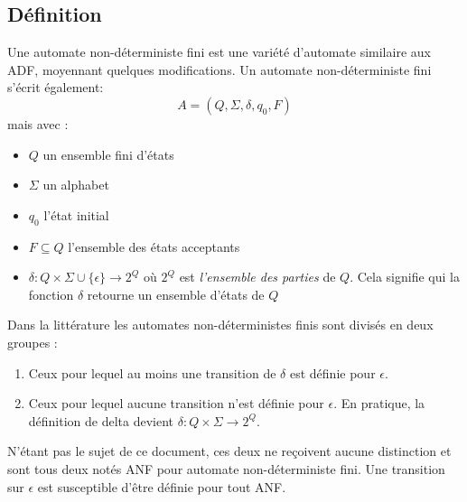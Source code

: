 \subsection{Définition}

Une automate non-déterministe fini est une variété d'automate similaire aux ADF, moyennant quelques modifications. Un automate non-déterministe fini s'écrit également:
	$$
	A=(Q,\Sigma, \delta, q_0, F)
	$$
mais avec :
\begin{itemize}
	\item $Q$ un ensemble fini d'états
	\item $\Sigma$ un alphabet
	\item $q_0$ l'état initial
	\item $F\subseteq Q$ l'ensemble des états acceptants
	\item $\delta : Q \times \Sigma \cup \{\epsilon\} \rightarrow 2^Q$ où $2^Q$ est \emph{l'ensemble des parties} de $Q$. Cela signifie qui la fonction $\delta$ retourne un ensemble d'états de $Q$
\end{itemize}

Dans la littérature \cite{??} les automates non-déterministes finis sont divisés en deux groupes :
\begin{enumerate}
	\item Ceux pour lequel au moins une transition de $\delta$ est définie pour $\epsilon$.
	\item Ceux pour lequel aucune transition n'est définie pour $\epsilon$. En pratique, la définition de delta devient $\delta : Q \times \Sigma \rightarrow 2^Q$.
\end{enumerate}
N'étant pas le sujet de ce document, ces deux ne reçoivent aucune distinction et sont tous deux notés ANF pour automate non-déterministe fini. Une transition sur $\epsilon$ est susceptible d'être définie pour tout ANF. 



